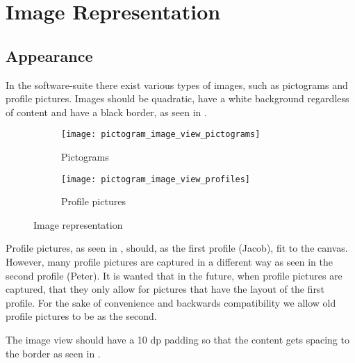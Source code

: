 
\chapter{Image Representation}

\section{Appearance}
\label{sec:appearance}
In the \giraf software-suite there exist various types of images, such as pictograms and profile pictures. Images should be quadratic, have a white background regardless of content and have a black border, as seen in . 


\begin{figure}[!htbp]
    \centering

    \begin{subfigure}[t]{0.4\textwidth}
    	\centering
        \texttt{[image: pictogram\_image\_view\_pictograms]}
        \caption{Pictograms}
        \label{fig:pictogram_image_view_pictograms}
    \end{subfigure}
    \hspace{5em} 
    \begin{subfigure}[t]{0.4\textwidth}
    	\centering
        \texttt{[image: pictogram\_image\_view\_profiles]}
        \caption{Profile pictures}
        \label{fig:pictogram_image_view_profiles}
    \end{subfigure}
    
    \caption{Image representation}
    \label{fig:pictogram_image_view}
\end{figure}

\begin{note}
	Profile pictures, as seen in , should, as the first profile (Jacob), fit to the canvas. However, many profile pictures are captured in a different way as seen in the second profile (Peter). It is wanted that in the future, when profile pictures are captured, that they only allow for pictures that have the layout of the first profile. For the sake of convenience and backwards compatibility we allow old profile pictures to be as the second.
\end{note}

\noindent
The image view should have a 10 dp padding so that the content gets spacing to the border as seen in .

